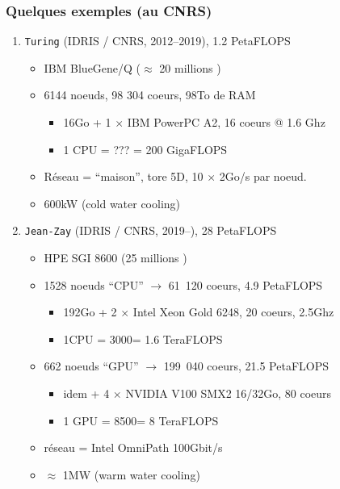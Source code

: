 \documentclass[xcolor={x11names,svgnames}]{beamer}
\newcommand{\euro}{\EUR\xspace}
\begin{document}

\begin{frame}
  \frametitle{Quelques exemples (au CNRS)}

  \begin{enumerate}
  \item \texttt{Turing} (IDRIS / CNRS, 2012--2019), 1.2 PetaFLOPS
    \begin{itemize}
    \item IBM BlueGene/Q ($\approx$ 20 millions \euro)
    \item 6144 noeuds, 98 304 coeurs, 98To de RAM
      \begin{itemize}
      \item 16Go + 1 $\times$ IBM PowerPC A2, 16 coeurs @ 1.6 Ghz
      \item 1 CPU = ??? \euro = 200 GigaFLOPS
      \end{itemize}
    \item Réseau = ``maison'', tore 5D, 10 $\times$ 2Go/s par noeud.
    \item 600kW (cold water cooling)
    \end{itemize}

    \medskip\pause

  \item<2-> \texttt{Jean-Zay} (IDRIS / CNRS, 2019--), 28 PetaFLOPS
    \begin{itemize}
    \item HPE SGI 8600 (25 millions \euro)
    \item 1528 noeuds ``CPU'' $\rightarrow$ 61~120 coeurs, 4.9 PetaFLOPS
      \begin{itemize}
        \item 192Go + 2 $\times$ Intel Xeon Gold 6248, 20 coeurs, 2.5Ghz
        \item 1CPU = 3000\euro = 1.6 TeraFLOPS
        \end{itemize}
    \item<3-> 662 noeuds ``GPU'' $\rightarrow$ 199~040 coeurs, 21.5 PetaFLOPS
      \begin{itemize}
      \item idem + 4 $\times$ NVIDIA V100 SMX2 16/32Go, 80 coeurs
      \item 1 GPU = 8500\euro = 8 TeraFLOPS
      \end{itemize}
    \item réseau = Intel OmniPath 100Gbit/s
    \item $\approx$ 1MW (warm water cooling)
    \end{itemize}
  \end{enumerate}
\end{frame}
\end{document}
